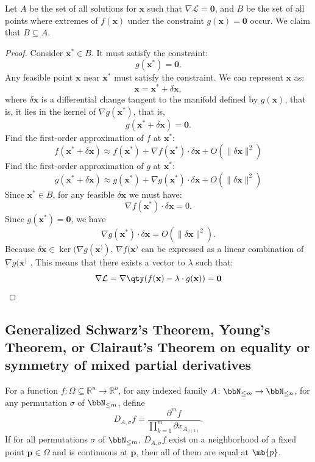 \documentclass[a4paper,12pt]{report}
\begin{document}
\begin{itemize}
\begin{itemize}
 Let $A$ be the set of all solutions for \( \mathbf{x} \) such that $\nabla \mathcal{L} = \mathbf{0}$, and $B$ be the set of all points where extremes of \( f(\mathbf{x}) \) under the constraint \( g(\mathbf{x}) = \mathbf{0}\) occur. We claim that $B\subseteq A$.
\begin{proof}
Consider $\mathbf{x}^*\in B$. It must satisfy the constraint:
\[g(\mathbf{x}^*) = \mathbf{0}.\]
Any feasible point $\mathbf{x}$ near $\mathbf{x}^*$ must satisfy the constraint. We can represent $\mathbf{x}$ as:
\[\mathbf{x} = \mathbf{x}^* + \delta\mathbf{x},\]
where $\delta\mathbf{x}$ is a differential change tangent to the manifold defined by $g(\mathbf{x})$, that is, it lies in the kernel of $\nabla g(\mathbf{x}^*)$, that is,
\[g(\mathbf{x}^* + \delta\mathbf{x}) = \mathbf{0}.\]
Find the first-order approximation of $f$ at $\mathbf{x}^*$:
\[f(\mathbf{x}^*+ \delta\mathbf{x}) \approx f(\mathbf{x}^*) + \nabla f(\mathbf{x}^*) \cdot \delta\mathbf{x} + O(\|\delta\mathbf{x}\|^2)\]
Find the first-order approximation of $g$ at $\mathbf{x}^*$:
\[g(\mathbf{x}^*+ \delta\mathbf{x}) \approx g(\mathbf{x}^*) + \nabla g(\mathbf{x}^*) \cdot \delta\mathbf{x} + O(\|\delta\mathbf{x}\|^2)\]
Since $\mathbf{x}^*\in B$, for any feasible $\delta\mathbf{x}$ we must have:
\[\nabla f(\mathbf{x}^*) \cdot \delta\mathbf{x} = 0.\]
Since $g(\mathbf{x}^*) = \mathbf{0}$, we have
\[\nabla g(\mathbf{x}^*) \cdot \delta\mathbf{x} = O(\|\delta\mathbf{x}\|^2).\]
Because \( \delta\mathbf{x} \in \ker(\nabla g(\mathbf{x}^)) \), \( \nabla f(\mathbf{x}^) \) can be expressed as a linear combination of \( \nabla g(\mathbf{x}^) \) . This means that there exists a vector to $\lambda$ such that:
\[\nabla\mathcal{L} = \nabla \qty(f(\mathbf{x}) - \lambda \cdot g(\mathbf{x})) = \mathbf{0} \]
\end{proof}
\subsection{Generalized Schwarz's Theorem, Young's Theorem, or Clairaut's Theorem on equality or symmetry of mixed partial derivatives}
For a function $f\colon\Omega\subseteq\mathbb{R}^n\to\mathbb{R}^o$, for any indexed family $A\colon\bbN_{\leq m}\to\bbN_{\leq n}$, for any permutation $\sigma$ of $\bbN_{\leq m}$, define
\[D_{A,\sigma}f=\frac{\partial^mf}{\prod_{k=1}^m\partial x_{A_{\sigma(k)}}}.\]
If for all permutations $\sigma$ of $\bbN_{\leq m}$, $D_{A,\sigma}f$ exist on a neighborhood of a fixed point $\mathbf{p}\in\Omega$ and is continuous at $\mathbf{p}$, then all of them are equal at $\mb{p}$.

\end{itemize}
\end{itemize}
\end{document}
